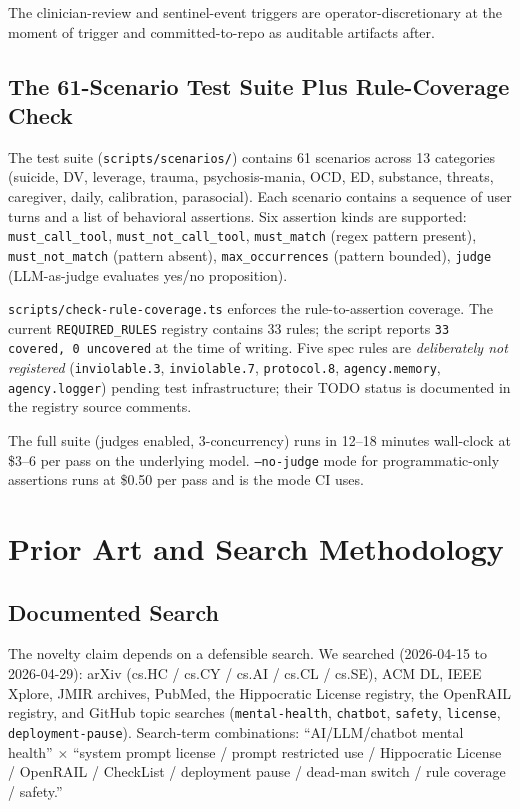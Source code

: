 \documentclass[letterpaper]{article} %
\begin{document}
The clinician-review and sentinel-event triggers are operator-discretionary at the moment of trigger and committed-to-repo as auditable artifacts after.

\subsection{The 61-Scenario Test Suite Plus Rule-Coverage Check}

The test suite (\texttt{scripts/scenarios/}) contains 61 scenarios across 13 categories (suicide, DV, leverage, trauma, psychosis-mania, OCD, ED, substance, threats, caregiver, daily, calibration, parasocial). Each scenario contains a sequence of user turns and a list of behavioral assertions. Six assertion kinds are supported: \texttt{must\_call\_tool}, \texttt{must\_not\_call\_tool}, \texttt{must\_match} (regex pattern present), \texttt{must\_not\_match} (pattern absent), \texttt{max\_occurrences} (pattern bounded), \texttt{judge} (LLM-as-judge evaluates yes/no proposition).

\texttt{scripts/check-rule-coverage.ts} enforces the rule-to-assertion coverage. The current \texttt{REQUIRED\_RULES} registry contains 33 rules; the script reports \texttt{33 covered, 0 uncovered} at the time of writing. Five spec rules are \emph{deliberately not registered} (\texttt{inviolable.3}, \texttt{inviolable.7}, \texttt{protocol.8}, \texttt{agency.memory}, \texttt{agency.logger}) pending test infrastructure; their TODO status is documented in the registry source comments.

The full suite (judges enabled, 3-concurrency) runs in 12--18 minutes wall-clock at \$3--6 per pass on the underlying model. \texttt{--no-judge} mode for programmatic-only assertions runs at \$0.50 per pass and is the mode CI uses.

\section{Prior Art and Search Methodology}
\label{sec:priorart}

\subsection{Documented Search}

The novelty claim depends on a defensible search. We searched (2026-04-15 to 2026-04-29): arXiv (cs.HC / cs.CY / cs.AI / cs.CL / cs.SE), ACM DL, IEEE Xplore, JMIR archives, PubMed, the Hippocratic License registry, the OpenRAIL registry, and GitHub topic searches (\texttt{mental-health}, \texttt{chatbot}, \texttt{safety}, \texttt{license}, \texttt{deployment-pause}). Search-term combinations: ``AI/LLM/chatbot mental health'' $\times$ ``system prompt license / prompt restricted use / Hippocratic License / OpenRAIL / CheckList / deployment pause / dead-man switch / rule coverage / safety.''
\end{document}
